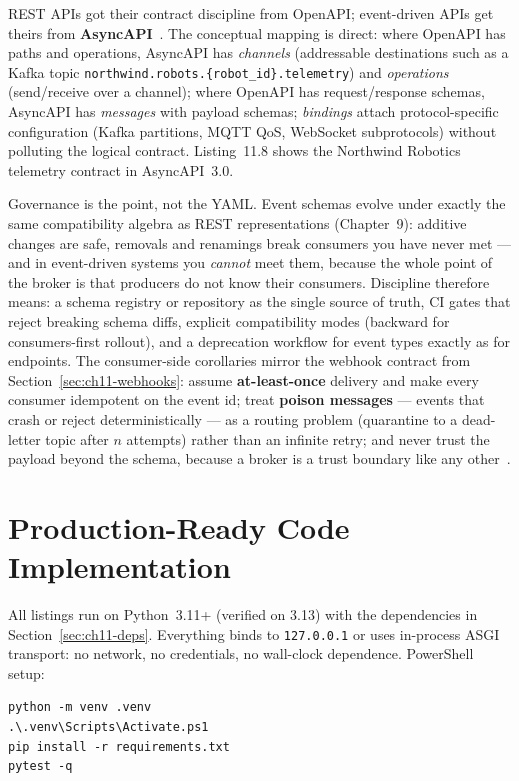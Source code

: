 REST APIs got their contract discipline from OpenAPI; event-driven APIs get
theirs from \textbf{AsyncAPI}~\cite{asyncapi}. The conceptual mapping is
direct: where OpenAPI has paths and operations, AsyncAPI has \emph{channels}
(addressable destinations such as a Kafka topic
\texttt{northwind.robots.\{robot\_id\}.telemetry}) and \emph{operations}
(send/receive over a channel); where OpenAPI has request/response schemas,
AsyncAPI has \emph{messages} with payload schemas; \emph{bindings} attach
protocol-specific configuration (Kafka partitions, MQTT QoS, WebSocket
subprotocols) without polluting the logical contract. Listing~11.8
shows the Northwind Robotics telemetry contract in AsyncAPI~3.0.

Governance is the point, not the YAML. Event schemas evolve under exactly the
same compatibility algebra as REST representations (Chapter~9): additive
changes are safe, removals and renamings break consumers you have never met
--- and in event-driven systems you \emph{cannot} meet them, because the
whole point of the broker is that producers do not know their consumers.
Discipline therefore means: a schema registry or repository as the single
source of truth, CI gates that reject breaking schema diffs, explicit
compatibility modes (backward for consumers-first rollout), and a deprecation
workflow for event types exactly as for endpoints. The consumer-side
corollaries mirror the webhook contract from
Section~\ref{sec:ch11-webhooks}: assume \textbf{at-least-once} delivery and
make every consumer idempotent on the event id; treat \textbf{poison
messages} --- events that crash or reject deterministically --- as a routing
problem (quarantine to a dead-letter topic after $n$ attempts) rather than an
infinite retry; and never trust the payload beyond the schema, because a
broker is a trust boundary like any other~\cite{kleppmann2017ddia,
newman2021microservices}.

\section{Production-Ready Code Implementation}
\label{sec:ch11-code}

All listings run on Python~3.11+ (verified on 3.13) with the dependencies in
Section~\ref{sec:ch11-deps}. Everything binds to \texttt{127.0.0.1} or uses
in-process ASGI transport: no network, no credentials, no wall-clock
dependence. PowerShell setup:

\begin{verbatim}
python -m venv .venv
.\.venv\Scripts\Activate.ps1
pip install -r requirements.txt
pytest -q
\end{verbatim}

